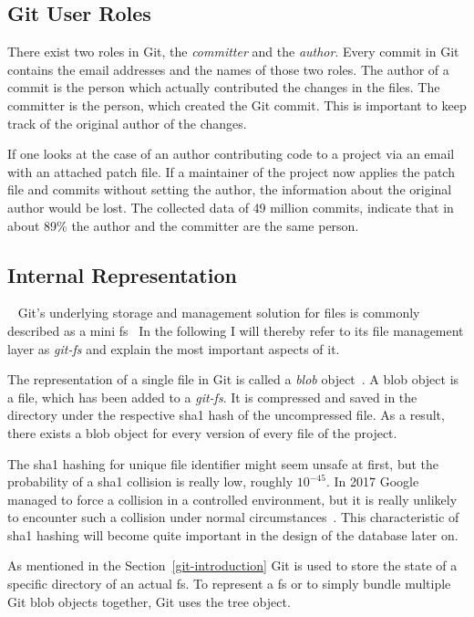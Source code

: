\subsection{Git User Roles}
There exist two roles in Git, the \emph{committer} and the \emph{author}.
Every commit in Git contains the email addresses and the names of those two roles.
The author of a commit is the person which actually contributed the changes in the files.
The committer is the person, which created the Git commit.
This is important to keep track of the original author of the changes.

If one looks at the case of an author contributing code to a project via an email with an attached patch file.
If a maintainer of the project now applies the patch file and commits without setting the author, the information about the original author would be lost.
The collected data of 49 million commits, indicate that in about 89\% the author and the committer are the same person.


\subsection{Internal Representation}~\label{git-internal-representation}
Git's underlying storage and management solution for files is commonly described as a mini \ac{fs}~\cite[p.~9]{book:pro-git}
In the following I will thereby refer to its file management layer as \emph{git-fs} and explain the most important aspects of it.

The representation of a single file in Git is called a \emph{blob} object~\cite[p.~56]{book:pro-git}.
A blob object is a file, which has been added to a \emph{git-fs}.
It is compressed and saved in the  directory under the respective \ac{sha1} hash of the uncompressed file.
As a result, there exists a blob object for every version of every file of the project.

The \ac{sha1} hashing for unique file identifier might seem unsafe at first, but the probability of a \ac{sha1} collision is really low, roughly $10^{-45}$.
In 2017 Google managed to force a collision in a controlled environment, but it is really unlikely to encounter such a collision under normal circumstances~\cite{techreport:sha-collision}.
This characteristic of \ac{sha1} hashing will become quite important in the design of the database later on.

As mentioned in the Section~\ref{git-introduction} Git is used to store the state of a specific directory of an actual \ac{fs}.
To represent a \ac{fs} or to simply bundle multiple Git blob objects together, Git uses the tree object.

